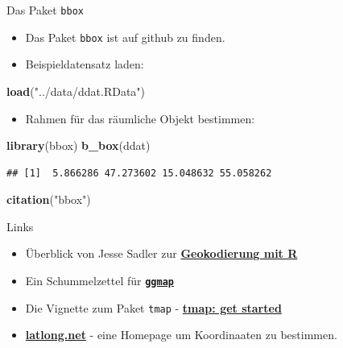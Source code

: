 \documentclass[ignorenonframetext,]{beamer}
\newenvironment{Shaded}{\begin{snugshade}}{\end{snugshade}}
\newcommand{\KeywordTok}[1]{\textcolor[rgb]{0.13,0.29,0.53}{\textbf{#1}}}
\newcommand{\StringTok}[1]{\textcolor[rgb]{0.31,0.60,0.02}{#1}}
\newcommand{\NormalTok}[1]{#1}
\providecommand{\tightlist}{%
  \setlength{\itemsep}{0pt}\setlength{\parskip}{0pt}}
\begin{document}
\begin{frame}[fragile]{Das Paket \texttt{bbox}}

\begin{itemize}
\item
  Das Paket \texttt{bbox} ist auf github zu finden.
\item
  Beispieldatensatz laden:
\end{itemize}

\begin{Shaded}
\begin{Highlighting}[]
\KeywordTok{load}\NormalTok{(}\StringTok{"../data/ddat.RData"}\NormalTok{)}
\end{Highlighting}
\end{Shaded}

\begin{itemize}
\tightlist
\item
  Rahmen für das räumliche Objekt bestimmen:
\end{itemize}

\begin{Shaded}
\begin{Highlighting}[]
\KeywordTok{library}\NormalTok{(bbox)}
\KeywordTok{b_box}\NormalTok{(ddat)}
\end{Highlighting}
\end{Shaded}

\begin{verbatim}
## [1]  5.866286 47.273602 15.048632 55.058262
\end{verbatim}

\begin{Shaded}
\begin{Highlighting}[]
\KeywordTok{citation}\NormalTok{(}\StringTok{"bbox"}\NormalTok{)}
\end{Highlighting}
\end{Shaded}

\end{frame}

\begin{frame}[fragile]{Links}

\begin{itemize}
\item
  Überblick von Jesse Sadler zur
  \href{https://www.jessesadler.com/post/geocoding-with-r/}{\textbf{Geokodierung
  mit R}}
\item
  Ein Schummelzettel für
  \href{https://www.nceas.ucsb.edu/~frazier/RSpatialGuides/ggmap/ggmapCheatsheet.pdf}{\textbf{\texttt{ggmap}}}
\item
  Die Vignette zum Paket \texttt{tmap} -
  \href{https://cran.r-project.org/web/packages/tmap/vignettes/tmap-getstarted.html}{\textbf{tmap:
  get started}}
\item
  \href{https://www.latlong.net/place/hamburg-germany-8766.html}{\textbf{latlong.net}}
  - eine Homepage um Koordinaaten zu bestimmen.
\end{itemize}

\end{frame}
\end{document}
